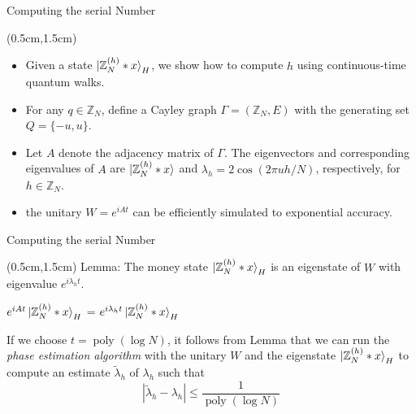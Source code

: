 \documentclass{beamer}
\theoremstyle{definition}
\begin{document}
\begin{frame}{Computing the serial Number}

    \begin{textblock*}{12cm}(0.5cm,1.5cm)

        \begin{itemize}
            \item Given a state $\ket{\mathbb{Z}_N^{(h)} * x}_H$, we show how to compute $h$ using continuous-time quantum walks.
            \vspace{0.5cm}
            \item For any $q \in \mathbb{Z}_N$, define a Cayley graph $\Gamma = (\mathbb{Z}_N, E)$ with the generating set $Q = \{-u, u\}$.
            \vspace{0.5cm}
            \item Let $A$ denote the adjacency matrix of $\Gamma$. The eigenvectors and corresponding eigenvalues of $A$ are $\ket{\mathbb{Z}_N^{(h)} * x}$ and $\lambda_h = 2\cos(2\pi uh / N)$, respectively, for $h \in \mathbb{Z}_N$.
            \vspace{0.5cm}
            \item the unitary $W = e^{iAt}$ can be efficiently simulated to exponential accuracy.
        \end{itemize}


    \end{textblock*}

 \end{frame}



 
\begin{frame}{Computing the serial Number}

    \begin{textblock*}{12cm}(0.5cm,1.5cm)
        Lemma: The money state $\ket{\mathbb{Z}_N^{(h)} * x}_H$ is an eigenstate of $W$ with eigenvalue $e^{i\lambda_h t}$.
        \vspace{1cm}

        $e^{iAt} \ket{\mathbb{Z}_N^{(h)} * x}_H$ = $e^{i\lambda_{h}t} \ket{\mathbb{Z}_N^{(h)} * x}_H$
        
        \vspace{1cm}
        If we choose $t = \operatorname{poly}(\log N)$, it follows from Lemma that we can run the \textit{phase estimation algorithm} with the unitary $W$ and the eigenstate $\ket{\mathbb{Z}_N^{(h)} * x}_H$ to compute an estimate $\tilde{\lambda}_h$ of $\lambda_h$ such that %
        \[
        |\tilde{\lambda}_h - \lambda_h| \leq \frac{1}{\operatorname{poly}(\log N)}
        \]
        

        
    \end{textblock*}

 \end{frame}
\end{document}
